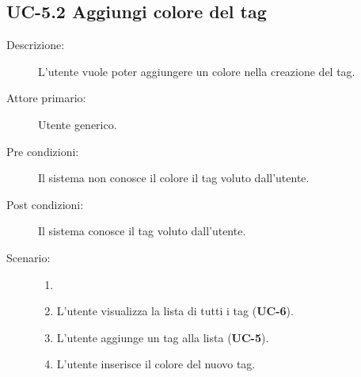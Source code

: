 \subsection{UC-5.2 Aggiungi colore del tag}
\begin{description}
    \item[Descrizione:] L’utente vuole poter aggiungere un colore nella creazione del tag.
    \item[Attore primario:] Utente generico.
    \item[Pre condizioni:] Il sistema non conosce il colore il tag voluto dall’utente.
    \item[Post condizioni:] Il sistema conosce il tag voluto dall’utente.
    \item[Scenario:]
    \begin{enumerate}
        \item[]
        \item L’utente visualizza la lista di tutti i tag (\textbf{UC-6}).
        \item L'utente aggiunge un tag alla lista (\textbf{UC-5}).
        \item L'utente inserisce il colore del nuovo tag.
    \end{enumerate}
\end{description}

